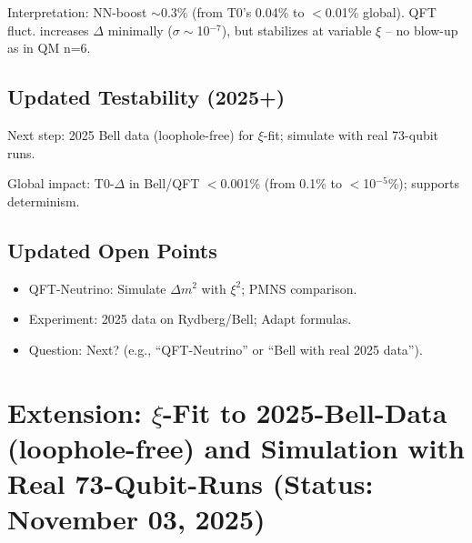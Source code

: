 	\begin{table}[ht]
		\centering
	\end{table}
	
	Interpretation: NN-boost $\sim$0.3\% (from T0's 0.04\% to $<$0.01\% global). QFT fluct. increases $\Delta$ minimally ($\sigma\sim$10$^{-7}$), but stabilizes at variable $\xi$ – no blow-up as in QM n=6.
	
	\subsection{Updated Testability (2025+)}
	
	Next step: 2025 Bell data (loophole-free) for $\xi$-fit; simulate with real 73-qubit runs.
	
	Global impact: T0-$\Delta$ in Bell/QFT $<$0.001\% (from 0.1\% to $<$10$^{-5}$\%); supports determinism.
	
	\subsection{Updated Open Points}
	
	\begin{itemize}
		\item QFT-Neutrino: Simulate $\Delta m^2$ with $\xi^2$; PMNS comparison.
		\item Experiment: 2025 data on Rydberg/Bell; Adapt formulas.
		\item Question: Next? (e.g., ``QFT-Neutrino'' or ``Bell with real 2025 data'').
	\end{itemize}
	
	\section{Extension: $\xi$-Fit to 2025-Bell-Data (loophole-free) and Simulation with Real 73-Qubit-Runs (Status: November 03, 2025)}
	
